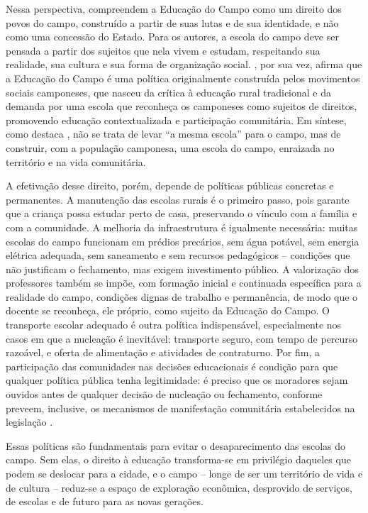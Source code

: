 \documentclass[
  12pt,
  openright,
  twoside,
  a4paper,
  english,
  brazilian,
  sumario=tradicional
]{abntex2}
\begin{document}
Nessa perspectiva,  compreendem a Educação do Campo como um direito dos povos do campo, construído a partir de suas lutas e de sua identidade, e não como uma concessão do Estado. Para os autores, a escola do campo deve ser pensada a partir dos sujeitos que nela vivem e estudam, respeitando sua realidade, sua cultura e sua forma de organização social. , por sua vez, afirma que a Educação do Campo é uma política originalmente construída pelos movimentos sociais camponeses, que nasceu da crítica à educação rural tradicional e da demanda por uma escola que reconheça os camponeses como sujeitos de direitos, promovendo educação contextualizada e participação comunitária. Em síntese, como destaca , não se trata de levar ``a mesma escola'' para o campo, mas de construir, com a população camponesa, uma escola do campo, enraizada no território e na vida comunitária.

A efetivação desse direito, porém, depende de políticas públicas concretas e permanentes. A manutenção das escolas rurais é o primeiro passo, pois garante que a criança possa estudar perto de casa, preservando o vínculo com a família e com a comunidade. A melhoria da infraestrutura é igualmente necessária: muitas escolas do campo funcionam em prédios precários, sem água potável, sem energia elétrica adequada, sem saneamento e sem recursos pedagógicos -- condições que não justificam o fechamento, mas exigem investimento público. A valorização dos professores também se impõe, com formação inicial e continuada específica para a realidade do campo, condições dignas de trabalho e permanência, de modo que o docente se reconheça, ele próprio, como sujeito da Educação do Campo. O transporte escolar adequado é outra política indispensável, especialmente nos casos em que a nucleação é inevitável: transporte seguro, com tempo de percurso razoável, e oferta de alimentação e atividades de contraturno. Por fim, a participação das comunidades nas decisões educacionais é condição para que qualquer política pública tenha legitimidade: é preciso que os moradores sejam ouvidos antes de qualquer decisão de nucleação ou fechamento, conforme preveem, inclusive, os mecanismos de manifestação comunitária estabelecidos na legislação \cite{brasil2010,brasil2014}.

Essas políticas são fundamentais para evitar o desaparecimento das escolas do campo. Sem elas, o direito à educação transforma-se em privilégio daqueles que podem se deslocar para a cidade, e o campo -- longe de ser um território de vida e de cultura -- reduz-se a espaço de exploração econômica, desprovido de serviços, de escolas e de futuro para as novas gerações.
\end{document}
